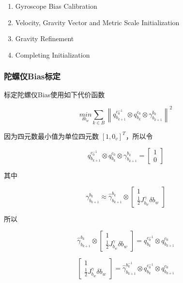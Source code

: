 \documentclass[12pt,a4paper]{article}
\begin{document}
\begin{enumerate}
\item Gyroscope Bias Calibration
\item Velocity, Gravity Vector and Metric Scale Initialization
\item Gravity Refinement
\item Completing Initialization
\end{enumerate}

\subsubsection{陀螺仪Bias标定}

标定陀螺仪Bias使用如下代价函数

\begin{equation}
\underset{\delta b_{w}}{min}\sum_{k\in B}^{ }\left \| q^{c_{0}^{-1}}_{b_{k+1}}\otimes q^{c_{0}}_{b_{k}}\otimes\gamma _{b_{k+1}}^{b_{k}} \right \|^{2}
\end{equation}

因为四元数最小值为单位四元数 $[1,0_{v}]^{T}$，所以令

\begin{equation}
q^{c_{0}^{-1}}_{b_{k+1}}\otimes q^{c_{0}}_{b_{k}}\otimes\gamma _{b_{k+1}}^{b_{k}} =
\begin{bmatrix}
1\\
0
\end{bmatrix}
\end{equation}

其中

\begin{equation}
\gamma _{b_{k+1}}^{b_{k}}\approx \hat{\gamma}_{b_{k+1}}^{b_{k}}\otimes \begin{bmatrix}
1\\
\frac{1}{2}J^{\gamma }_{b_{w}}\delta b_{w}
\end{bmatrix}
\end{equation}

所以

\begin{equation}
\hat{\gamma}_{b_{k+1}}^{b_{k}} \otimes
\begin{bmatrix}
1\\
\frac{1}{2}J^{\gamma }_{b_{w}}\delta b_{w}
\end{bmatrix}
= q^{c_{0}^{-1}}_{b_{k}}\otimes q^{c_{0}}_{b_{k+1}}
\end{equation}

\begin{equation}
\begin{bmatrix}
1\\
\frac{1}{2}J^{\gamma }_{b_{w}}\delta b_{w}
\end{bmatrix}=\hat{\gamma}_{b_{k+1}}^{b_{k}^{-1}}\otimes q^{c_{0}^{-1}}_{b_{k}}\otimes q^{c_{0}}_{b_{k+1}}
\end{equation}
\end{document}
